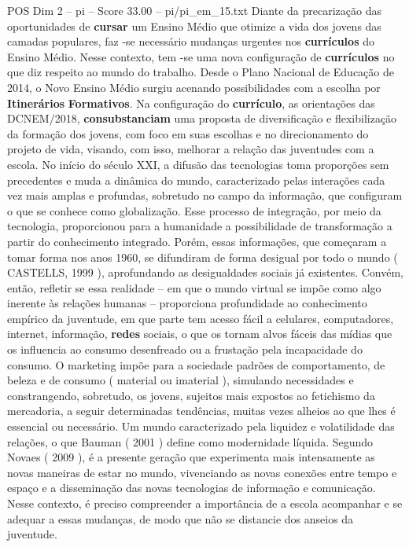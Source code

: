 \begin{textsample}{POS Dim 2 – pi – Score 33.00 – pi/pi\_em\_15.txt}
Diante da precarização das oportunidades de \textbf{cursar} um Ensino Médio que otimize a vida dos jovens das camadas populares, faz -se necessário mudanças urgentes nos \textbf{currículos} do Ensino Médio.
Nesse contexto, tem -se uma nova configuração de \textbf{currículos} no que diz respeito ao mundo do trabalho.
Desde o Plano Nacional de Educação de 2014, o Novo Ensino Médio surgiu acenando possibilidades com a escolha por \textbf{Itinerários} \textbf{Formativos}.
Na configuração do \textbf{currículo}, as orientações das DCNEM/2018, \textbf{consubstanciam} uma proposta de diversificação e flexibilização da formação dos jovens, com foco em suas escolhas e no direcionamento do projeto de vida, visando, com isso, melhorar a relação das juventudes com a escola.
No início do século XXI, a difusão das tecnologias toma proporções sem precedentes e muda a dinâmica do mundo, caracterizado pelas interações cada vez mais amplas e profundas, sobretudo no campo da informação, que configuram o que se conhece como globalização.
Esse processo de integração, por meio da tecnologia, proporcionou para a humanidade a possibilidade de transformação a partir do conhecimento integrado.
Porém, essas informações, que começaram a tomar forma nos anos 1960, se difundiram de forma desigual por todo o mundo ( CASTELLS, 1999 ), aprofundando as desigualdades sociais já existentes.
Convém, então, refletir se essa realidade – em que o mundo virtual se impõe como algo inerente às relações humanas – proporciona profundidade ao conhecimento empírico da juventude, em que parte tem acesso fácil a celulares, computadores, internet, informação, \textbf{redes} sociais, o que os tornam alvos fáceis das mídias que os influencia ao consumo desenfreado ou a frustação pela incapacidade do consumo.
O marketing impõe para a sociedade padrões de comportamento, de beleza e de consumo ( material ou imaterial ), simulando necessidades e constrangendo, sobretudo, os jovens, sujeitos mais expostos ao fetichismo da mercadoria, a seguir determinadas tendências, muitas vezes alheios ao que lhes é essencial ou necessário.
Um mundo caracterizado pela liquidez e volatilidade das relações, o que Bauman ( 2001 ) define como modernidade líquida.
Segundo Novaes ( 2009 ), é a presente geração que experimenta mais intensamente as novas maneiras de estar no mundo, vivenciando as novas conexões entre tempo e espaço e a disseminação das novas tecnologias de informação e comunicação.
Nesse contexto, é preciso compreender a importância de a escola acompanhar e se adequar a essas mudanças, de modo que não se distancie dos anseios da juventude.

\end{textsample}
